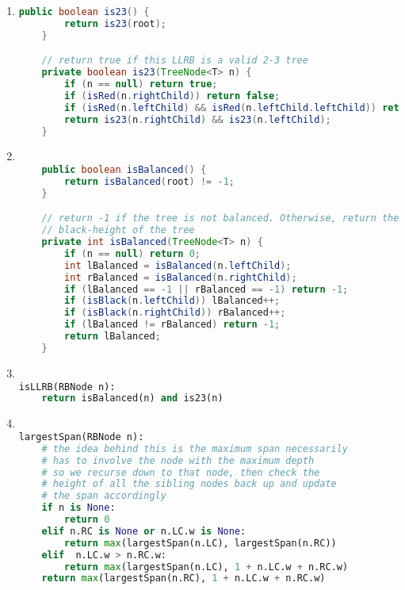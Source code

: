 \documentclass{article}
\begin{document}
\clearpage

\begin{enumerate}
    \item 

\begin{lstlisting}[language=Java]
    public boolean is23() {
        return is23(root);
    }

    // return true if this LLRB is a valid 2-3 tree
    private boolean is23(TreeNode<T> n) {
        if (n == null) return true;
        if (isRed(n.rightChild)) return false;
        if (isRed(n.leftChild) && isRed(n.leftChild.leftChild)) return false;
        return is23(n.rightChild) && is23(n.leftChild);
    }
\end{lstlisting}

\item


\begin{lstlisting}[language=Java]

    public boolean isBalanced() {
        return isBalanced(root) != -1;
    }

    // return -1 if the tree is not balanced. Otherwise, return the
    // black-height of the tree
    private int isBalanced(TreeNode<T> n) {
        if (n == null) return 0;
        int lBalanced = isBalanced(n.leftChild);
        int rBalanced = isBalanced(n.rightChild);
        if (lBalanced == -1 || rBalanced == -1) return -1;
        if (isBlack(n.leftChild)) lBalanced++;
        if (isBlack(n.rightChild)) rBalanced++;
        if (lBalanced != rBalanced) return -1;
        return lBalanced;
    }

\end{lstlisting}

\item


\begin{lstlisting}[language=Python]

isLLRB(RBNode n):
    return isBalanced(n) and is23(n)

\end{lstlisting}

\item


\begin{lstlisting}[language=Python]

largestSpan(RBNode n):
    # the idea behind this is the maximum span necessarily
    # has to involve the node with the maximum depth
    # so we recurse down to that node, then check the 
    # height of all the sibling nodes back up and update 
    # the span accordingly
    if n is None:
        return 0
    elif n.RC is None or n.LC.w is None:
        return max(largestSpan(n.LC), largestSpan(n.RC))
    elif  n.LC.w > n.RC.w:
        return max(largestSpan(n.LC), 1 + n.LC.w + n.RC.w)
    return max(largestSpan(n.RC), 1 + n.LC.w + n.RC.w)
        

\end{lstlisting}
\end{enumerate}
\end{document}
